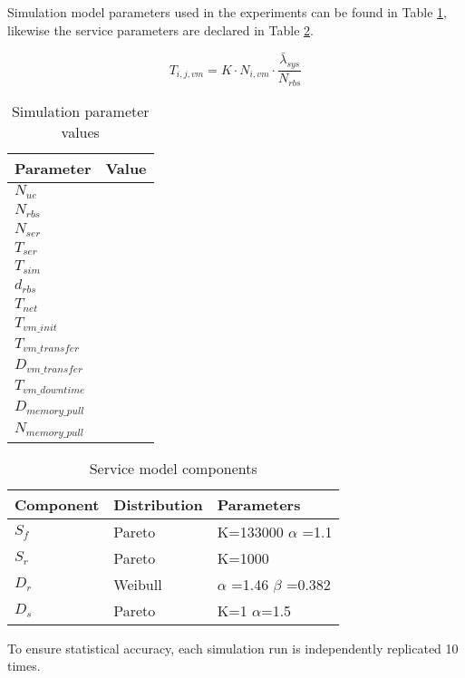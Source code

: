Simulation model parameters used in the experiments can be found in Table \ref{table:simulation_parameters}, likewise the service parameters are declared in Table \ref{table:traffic_parameters}.

\begin{equation}
\label{eq:service_time}
T_{i,j,vm} = K \cdot N_{i,vm} \cdot \frac{ \bar{\lambda}_{sys} }{N_{rbs}}
\end{equation}

\begin{table}[tb]
 	\centering
 	
    \begin{tabular}{|l|l|} \hline
    	\textbf{Parameter}    	& \textbf{Value} \\ \hline
    	$N_{ue}$						& \\ \hline
    	$N_{rbs}$						& \\ \hline
    	$N_{ser}$						& \\ \hline
    	$T_{ser}$						& \\ \hline
    	$T_{sim}$						& \\ \hline
    	$d_{rbs}$						& \\ \hline
    	$T_{net}$						& \\ \hline
        $T_{vm\_init}$				& \\ \hline
        $T_{vm\_transfer}$		& \\ \hline
		$D_{vm\_transfer}$		& \\ \hline
		$T_{vm\_downtime}$	& \\ \hline
		$D_{memory\_pull}$	& \\ \hline
		$N_{memory\_pull}$	& \\ \hline
    \end{tabular}
    
    \caption{Simulation parameter values}
    \label{table:simulation_parameters}
\end{table}

\begin{table}[tb]
	\centering
	
    \begin{tabular}{|l|l|l|}\hline
    	\textbf{Component}  	& \textbf{Distribution} 	& \textbf{Parameters}     \\ \hline
    	$S_f$   & Pareto   				& K=133000 $\alpha$ =1.1  \\ \hline
    	$S_r$   & Pareto    				& K=1000         \\ \hline
    	$D_r$ 	& Weibull    				& $\alpha$ =1.46 $\beta$ =0.382 \\ \hline
    	$D_s$ 	& Pareto     				& K=1 $\alpha$=1.5      \\ \hline
    \end{tabular}
    
    \caption{Service model components}
    \label{table:traffic_parameters}
\end{table}

To ensure statistical accuracy, each simulation run is independently replicated 10 times.